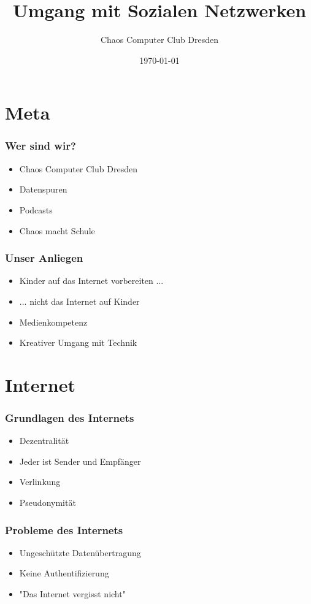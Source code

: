 \documentclass{beamer}
\title{Umgang mit Sozialen Netzwerken}
\author{Chaos Computer Club Dresden}
\date{\today}
\begin{document}
\maketitle
\frame{\tableofcontents}

\section{Meta}

\begin{frame}
  \frametitle{Wer sind wir?}
  \begin{itemize}
    \item<1-> Chaos Computer Club Dresden
    \item<2-> Datenspuren
    \item<3-> Podcasts
    \item<4-> Chaos macht Schule
  \end{itemize}
\end{frame}

\begin{frame}
  \frametitle{Unser Anliegen}
  \begin{itemize}
    \item<1-> Kinder auf das Internet vorbereiten ...
    \item<2-> ... nicht das Internet auf Kinder
    \item<3-> Medienkompetenz
    \item<4-> Kreativer Umgang mit Technik
  \end{itemize}
\end{frame}

\section{Internet}

\begin{frame}
  \frametitle{Grundlagen des Internets}
  \begin{itemize}
    \item<1-> Dezentralität
    \item<2-> Jeder ist Sender und Empfänger
    \item<3-> Verlinkung
    \item<4-> Pseudonymität
  \end{itemize}
\end{frame}

\begin{frame}
  \frametitle{Probleme des Internets}
  \begin{itemize}
    \item<1-> Ungeschützte Datenübertragung
    \item<2-> Keine Authentifizierung
    \item<3-> "Das Internet vergisst nicht"
  \end{itemize}
\end{frame}
\end{document}
